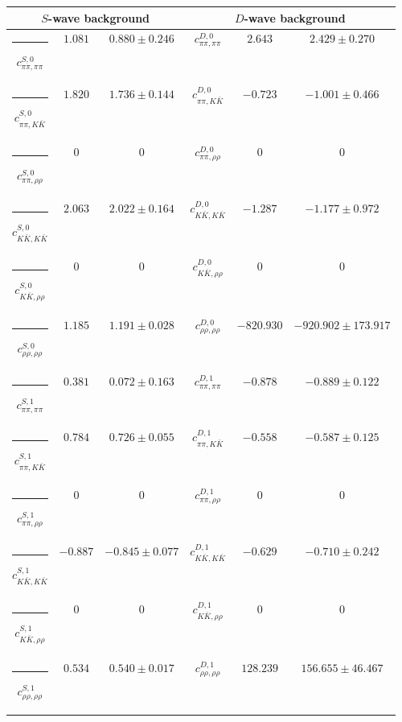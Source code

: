 \begin{table}[h]
\begin{ruledtabular}
\begin{tabular}{c c c c c c c c c}
\end{tabular}
\vspace{2em}
\begin{tabular}{c c c c c c}
\multicolumn{3}{c}{$S$-wave background}  & \multicolumn{3}{c}{$D$-wave background} \\ \hline
\rule[-0.2cm]{-0.1cm}{.55cm} $c^{S,0}_{\pi\pi,\pi\pi}$ &$1.081$ & $0.880 \pm 0.246$ & $c^{D,0}_{\pi\pi,\pi\pi}$ &$2.643$ & $2.429 \pm 0.270$ \\
\rule[-0.2cm]{-0.1cm}{.55cm} $c^{S,0}_{\pi\pi,K\bar K}$ &$1.820$ & $1.736 \pm 0.144$ & $c^{D,0}_{\pi\pi,K\bar K}$ &$-0.723$ & $-1.001 \pm 0.466$ \\
\rule[-0.2cm]{-0.1cm}{.55cm} $c^{S,0}_{\pi\pi,\rho\rho}$ &$0$ & $0$ & $c^{D,0}_{\pi\pi,\rho\rho}$ &$0$ & $0$ \\
\rule[-0.2cm]{-0.1cm}{.55cm} $c^{S,0}_{K\bar K,K\bar K}$ &$2.063$ & $2.022 \pm 0.164$ & $c^{D,0}_{K\bar K,K\bar K}$ &$-1.287$ & $-1.177 \pm 0.972$ \\
\rule[-0.2cm]{-0.1cm}{.55cm} $c^{S,0}_{K\bar K,\rho\rho}$ &$0$ & $0$ & $c^{D,0}_{K\bar K,\rho\rho}$ &$0$ & $0$ \\
\rule[-0.2cm]{-0.1cm}{.55cm} $c^{S,0}_{\rho\rho,\rho\rho}$ &$1.185$ & $1.191 \pm 0.028$ & $c^{D,0}_{\rho\rho,\rho\rho}$ &$-820.930$ & $-920.902 \pm 173.917$ \\
\rule[-0.2cm]{-0.1cm}{.55cm} $c^{S,1}_{\pi\pi,\pi\pi}$ &$0.381$ & $0.072 \pm 0.163$ & $c^{D,1}_{\pi\pi,\pi\pi}$ &$-0.878$ & $-0.889 \pm 0.122$ \\
\rule[-0.2cm]{-0.1cm}{.55cm} $c^{S,1}_{\pi\pi,K\bar K}$ &$0.784$ & $0.726 \pm 0.055$ & $c^{D,1}_{\pi\pi,K\bar K}$ &$-0.558$ & $-0.587 \pm 0.125$ \\
\rule[-0.2cm]{-0.1cm}{.55cm} $c^{S,1}_{\pi\pi,\rho\rho}$ &$0$ & $0$ & $c^{D,1}_{\pi\pi,\rho\rho}$ &$0$ & $0$ \\
\rule[-0.2cm]{-0.1cm}{.55cm} $c^{S,1}_{K\bar K,K\bar K}$ &$-0.887$ & $-0.845 \pm 0.077$ & $c^{D,1}_{K\bar K,K\bar K}$ &$-0.629$ & $-0.710 \pm 0.242$ \\
\rule[-0.2cm]{-0.1cm}{.55cm} $c^{S,1}_{K\bar K,\rho\rho}$ &$0$ & $0$ & $c^{D,1}_{K\bar K,\rho\rho}$ &$0$ & $0$ \\
\rule[-0.2cm]{-0.1cm}{.55cm} $c^{S,1}_{\rho\rho,\rho\rho}$ &$0.534$ & $0.540 \pm 0.017$ & $c^{D,1}_{\rho\rho,\rho\rho}$ &$128.239$ & $156.655 \pm 46.467$ \\
\end{tabular}
\end{ruledtabular}
\end{table}
